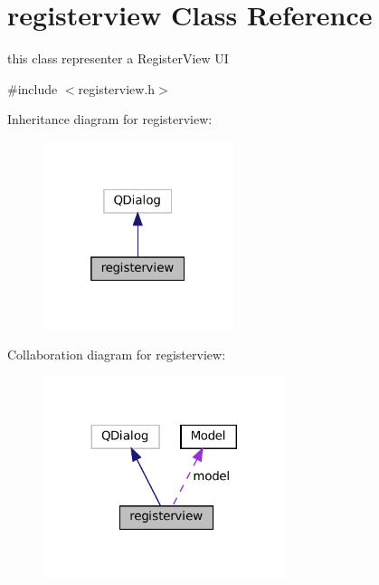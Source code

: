 \hypertarget{classregisterview}{}\section{registerview Class Reference}
\label{classregisterview}


this class representer a Register\+View UI  




{\ttfamily \#include $<$registerview.\+h$>$}



Inheritance diagram for registerview\+:
\nopagebreak
\begin{figure}[H]
\begin{center}
\leavevmode
\includegraphics[width=157pt]{classregisterview__inherit__graph}
\end{center}
\end{figure}


Collaboration diagram for registerview\+:
\nopagebreak
\begin{figure}[H]
\begin{center}
\leavevmode
\includegraphics[width=200pt]{classregisterview__coll__graph}
\end{center}
\end{figure}
